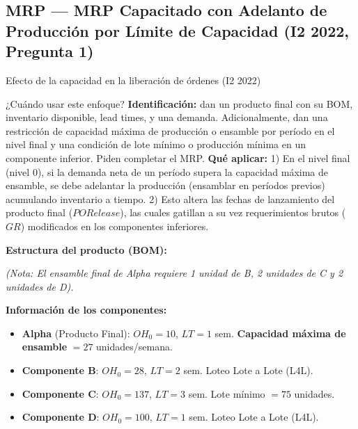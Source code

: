 \subsection[MRP: Capacidad Limitada (I2 2022)]{MRP --- MRP Capacitado con Adelanto de Producción por Límite de Capacidad (I2 2022, Pregunta 1)}

\begin{ejercicio}{Efecto de la capacidad en la liberación de órdenes (I2 2022)}

\begin{tipprueba}{¿Cuándo usar este enfoque?}
\textbf{Identificación:} dan un producto final con su BOM, inventario disponible, lead times, y una demanda. Adicionalmente, dan una restricción de capacidad máxima de producción o ensamble por período en el nivel final y una condición de lote mínimo o producción mínima en un componente inferior. Piden completar el MRP.
\textbf{Qué aplicar:}
1) En el nivel final (nivel 0), si la demanda neta de un período supera la capacidad máxima de ensamble, se debe adelantar la producción (ensamblar en períodos previos) acumulando inventario a tiempo.
2) Esto altera las fechas de lanzamiento del producto final ($PORelease$), las cuales gatillan a su vez requerimientos brutos ($GR$) modificados en los componentes inferiores.
\end{tipprueba}

\textbf{Estructura del producto (BOM):}
\begin{center}
\end{center}
\textit{(Nota: El ensamble final de Alpha requiere 1 unidad de B, 2 unidades de C y 2 unidades de D).}

\textbf{Información de los componentes:}
\begin{itemize}[leftmargin=1.4em, itemsep=1pt]
  \item \textbf{Alpha} (Producto Final): $OH_0 = 10$, $LT = 1$ sem. \textbf{Capacidad máxima de ensamble} $= 27$ unidades/semana.
  \item \textbf{Componente B}: $OH_0 = 28$, $LT = 2$ sem. Loteo Lote a Lote (L4L).
  \item \textbf{Componente C}: $OH_0 = 137$, $LT = 3$ sem. Lote mínimo $= 75$ unidades.
  \item \textbf{Componente D}: $OH_0 = 100$, $LT = 1$ sem. Loteo Lote a Lote (L4L).
\end{itemize}


\end{ejercicio}
